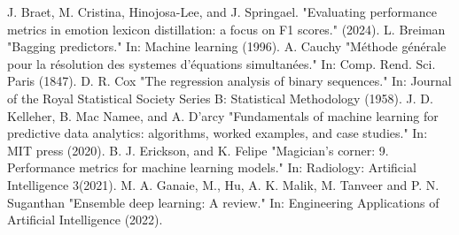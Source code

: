 \documentclass[10pt, conference]{IEEEtran}
\begin{document}
\begin{thebibliography}{00}
     J. Braet, M. Cristina, Hinojosa-Lee, and J. Springael. "Evaluating performance metrics in emotion lexicon distillation: a focus on F1 scores." (2024).
     L. Breiman "Bagging predictors." In: Machine learning (1996).
     A. Cauchy "Méthode générale pour la résolution des systemes d’équations simultanées." In: Comp. Rend. Sci. Paris (1847).
     D. R. Cox "The regression analysis of binary sequences." In: Journal of the Royal Statistical Society Series B: Statistical Methodology (1958).
     J. D. Kelleher, B. Mac Namee, and A. D'arcy "Fundamentals of machine learning for predictive data analytics: algorithms, worked examples, and case studies." In: MIT press (2020).
     B. J. Erickson, and K. Felipe "Magician’s corner: 9. Performance metrics for machine learning models." In: Radiology: Artificial Intelligence 3(2021).
     M. A. Ganaie, M., Hu, A. K. Malik, M. Tanveer and P. N. Suganthan "Ensemble deep learning: A review." In: Engineering Applications of Artificial Intelligence (2022).
\end{thebibliography}

\printglossary[type=\acronymtype]
\end{document}
